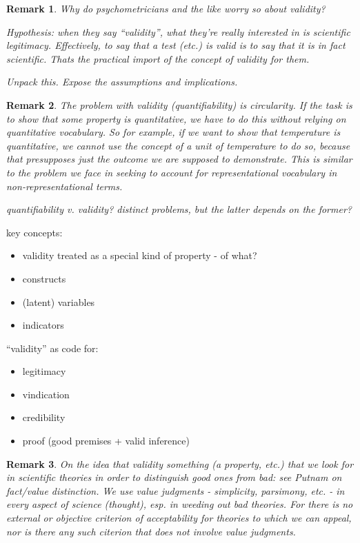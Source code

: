 \documentclass[11pt,twoside]{article}
\newtheorem{remark}{Remark}
\begin{document}
\begin{remark}
Why do psychometricians and the like worry so about validity?

Hypothesis: when they say ``validity'', what they're really interested
in is scientific legitimacy.  Effectively, to say that a test (etc.)
is valid is to say that it is in fact scientific.  Thats the practical
import of the concept of validity for them.

Unpack this.  Expose the assumptions and implications.
\end{remark}

\begin{remark}
  The problem with validity (quantifiability) is circularity.  If the
  task is to show that some property is quantitative, we have to do
  this without relying on quantitative vocabulary.  So for example, if
  we want to show that temperature is quantitative, we cannot use the
  concept of a unit of temperature to do so, because that presupposes
  just the outcome we are supposed to demonstrate.  This is similar to
  the problem we face in seeking to account for representational
  vocabulary in non-representational terms.

  quantifiability v. validity?  distinct problems, but the latter
  depends on the former?
\end{remark}

key concepts:

\begin{itemize}
\item validity treated as a special kind of property - of what?
\item constructs
\item (latent) variables
\item indicators
\end{itemize}

``validity'' as code for:

\begin{itemize}
\item legitimacy
\item vindication
\item credibility
\item proof (good premises + valid inference)
\end{itemize}

\begin{remark}
  On the idea that validity something (a property, etc.) that we look
  for in scientific theories in order to distinguish good ones from
  bad: see Putnam on fact/value distinction.  We use value judgments -
  simplicity, parsimony, etc. - in every aspect of science (thought),
  esp. in weeding out bad theories.  For there is no external or
  objective criterion of acceptability for theories to which we can
  appeal, nor is there any such citerion that does not involve value
  judgments.
\end{remark}
\end{document}
